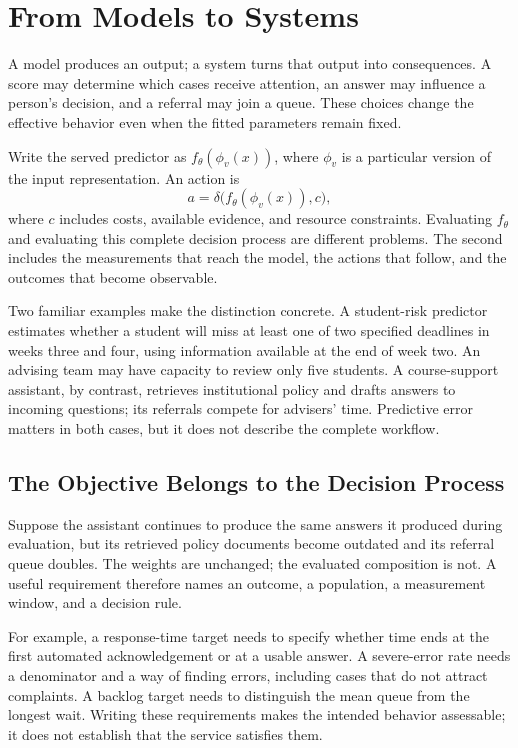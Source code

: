 \begingroup
\raggedbottom
{}

\chapter{From Models to Systems}
\label{ch:models-systems}

A model produces an output; a system turns that output into consequences. A score may determine which cases receive attention, an answer may influence a person's decision, and a referral may join a queue. These choices change the effective behavior even when the fitted parameters remain fixed.

Write the served predictor as $f_\theta(\phi_v(x))$, where $\phi_v$ is a particular version of the input representation. An action is
\[
a=\delta\bigl(f_\theta(\phi_v(x)),c\bigr),
\]
where $c$ includes costs, available evidence, and resource constraints. Evaluating $f_\theta$ and evaluating this complete decision process are different problems. The second includes the measurements that reach the model, the actions that follow, and the outcomes that become observable.

Two familiar examples make the distinction concrete. A student-risk predictor estimates whether a student will miss at least one of two specified deadlines in weeks three and four, using information available at the end of week two. An advising team may have capacity to review only five students. A course-support assistant, by contrast, retrieves institutional policy and drafts answers to incoming questions; its referrals compete for advisers' time. Predictive error matters in both cases, but it does not describe the complete workflow.

\section{The Objective Belongs to the Decision Process}

Suppose the assistant continues to produce the same answers it produced during evaluation, but its retrieved policy documents become outdated and its referral queue doubles. The weights are unchanged; the evaluated composition is not. A useful requirement therefore names an outcome, a population, a measurement window, and a decision rule.

For example, a response-time target needs to specify whether time ends at the first automated acknowledgement or at a usable answer. A severe-error rate needs a denominator and a way of finding errors, including cases that do not attract complaints. A backlog target needs to distinguish the mean queue from the longest wait. Writing these requirements makes the intended behavior assessable; it does not establish that the service satisfies them.

